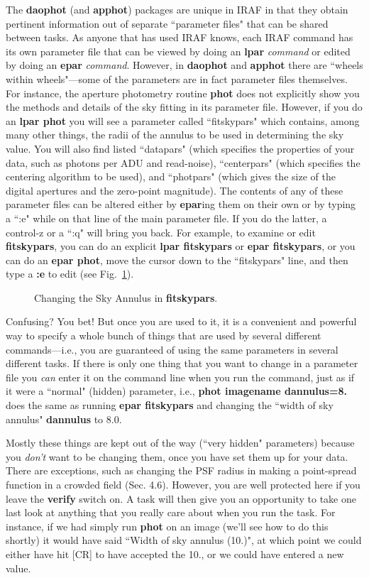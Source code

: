 The {\bf daophot} (and {\bf apphot}) packages are unique in IRAF in that
they obtain
pertinent information out of separate ``parameter files" that can be
shared between tasks.  As anyone that
has used IRAF knows, each IRAF command has its own parameter file that
can
be viewed by doing an {\bf lpar} {\it command} or edited by doing an
{\bf epar} {\it command}.
However, in {\bf daophot} and {\bf apphot} there are ``wheels within
wheels"---some of the parameters are in fact parameter files themselves.
For instance, the aperture photometry routine {\bf phot} does not
explicitly
show you the methods and details of
the sky fitting in its parameter file.  
However, if you do an {\bf lpar phot}
you will see a parameter
called ``fitskypars" which
contains, among many other things, the radii of the annulus to be used
in determining the sky value.
You will also find listed ``datapars" (which specifies the properties
of your data, such as photons per ADU and read-noise), ``centerpars"
(which
specifies the centering algorithm to be used), and ``photpars" (which gives
the
size of the digital apertures and the zero-point magnitude).
The contents of any of these parameter files can be altered either by
{\bf epar}ing them on their own or by typing a ``:e" while on that
line of the main parameter file.  If you do the latter, a control-z
or a ``:q" will bring you back. 
For example, to examine or edit {\bf fitskypars}, you can 
do an explicit {\bf lpar fitskypars}
or {\bf epar fitskypars}, or you can do an {\bf epar phot}, move the
cursor down to the ``fitskypars" line, and then type a {\bf :e} to edit
(see Fig.~\ref{wheels}).
\begin{figure}
\vspace{4.2in}
\caption{\label{wheels}Changing the Sky Annulus in {\bf fitskypars}.}
\end{figure}
Confusing?  You bet!
But once you are used to it, it is a convenient and powerful way to
specify a whole bunch of things that are used by several different
commands---i.e., you are guaranteed of using the same parameters in
several different tasks.  If there is only one thing that you want to
change in
a parameter file you {\it can} enter it on the command line when
you run the command, just as if it were a ``normal" (hidden) parameter,
i.e., {\bf phot imagename dannulus=8.} does the same as
running {\bf epar fitskypars} and changing the ``width of sky annulus"
{\bf dannulus} to 8.0.
 
Mostly these things are kept out of the way (``very hidden" parameters)
because you {\it don't} want to be changing them, once you have set them
up for your data.  There are exceptions, such as changing the PSF radius
in making a point-spread function in a crowded field (Sec. 4.6).
However,
you are well protected here if you leave the {\bf verify} switch on.
A task will then give you an opportunity to take one last look at
anything
that you really care about when you run the task.  For instance, if we
had simply run {\bf phot} on an image (we'll see how to do this shortly)
it would have said ``Width of sky annulus (10.)", at which point we
could
either have hit [CR] to have accepted the 10., or we could have
entered a new value.
 
